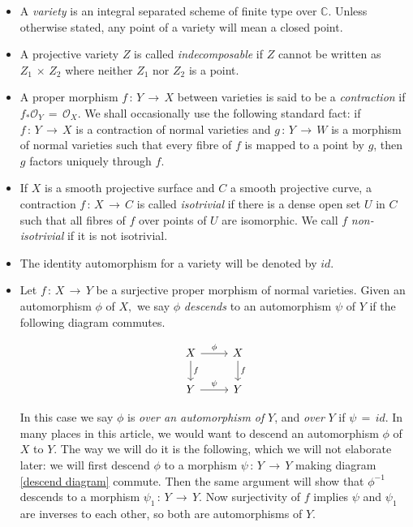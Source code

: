 \documentclass[12pt,reqno]{amsart}
\theoremstyle{definition}
\numberwithin{equation}{section}
\begin{document}
\begin{itemize}
\item A \textit{variety} is an integral separated scheme of finite type over $\mathbb{C}$. Unless otherwise stated, any point of a variety will mean a closed point.
\item A projective variety $Z$ is called \textit{indecomposable} if $Z$ cannot be written as $Z_{1}\,\times\, Z_{2}$ where neither $Z_{1}$ nor $Z_{2}$ is a point.
\item A proper morphism $f\,:\,Y\,\to\, X$ between varieties is said to be a \textit{contraction} if $f_* \mathcal{O}_Y\,=\,\mathcal{O}_X$. We shall occasionally use the following standard fact: if $f\,:\,Y\,\to\, X$ is a contraction of normal varieties and $g\,:\,Y\,\to\, W$ is a morphism of normal varieties such that every fibre of $f$ is mapped to a point by $g$, then $g$ factors uniquely through $f.$
    \item If $X$ is a smooth projective surface and $C$ a smooth projective curve, a contraction $f\,:\, X\,\to\, C$ is called \textit{isotrivial} if there is a dense open set $U$ in $C$ such that all fibres of $f$ over points of $U$ are isomorphic. We call $f$ \textit{non-isotrivial} if it is not isotrivial.
    \item The identity automorphism for a variety will be denoted by $id$.
    \item Let $f\,:\,X\,\to\, Y$ be a surjective  proper morphism of normal varieties. Given an automorphism $\phi$ of $X,$ we say $\phi$ \textit{descends} to an automorphism $\psi$ of $Y$ if the following diagram commutes.
    

\begin{equation}\label{descend diagram}
\begin{tikzcd}
X \arrow[r, "\phi"] \arrow[d,"f"]
& X \arrow[d, "f" ] \\
Y  \arrow[r,"\psi" ]
& |[, rotate=0]| Y
\end{tikzcd}
\end{equation}

In this case we say $\phi$ is \textit{over an automorphism of} $Y$, and \textit{over} $Y$ if $\psi\,=\,id.$
In many places in this article, we would want to descend an automorphism $\phi$ of $X$ to $Y$. The way we will do it is the following, which we will not elaborate later:  we will first descend $\phi$ to a morphism $\psi\,:\,Y\,\to\,Y$ making diagram \ref{descend diagram} commute. Then the same argument will show that $\phi^{-1}$ descends to a morphism $\psi_1\,:\,Y\,\to\, Y$. Now surjectivity of $f$ implies $\psi$ and $\psi_1$ are inverses to each other, so both are automorphisms of $Y$.


\end{itemize}
\end{document}
